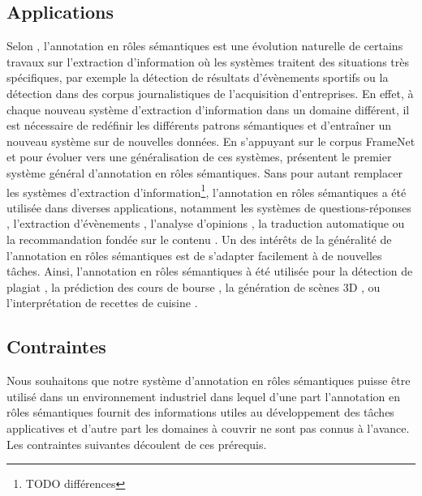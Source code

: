 \subsection{Applications}

Selon \cite{gildea2002automatic}, l'annotation en rôles sémantiques est une
évolution naturelle de certains travaux sur l'extraction d'information où les
systèmes traitent des situations très spécifiques, par exemple la détection de
résultats d'évènements sportifs ou la détection dans des corpus journalistiques
de l'acquisition d'entreprises. En effet, à chaque nouveau système d'extraction
d'information dans un domaine différent, il est nécessaire de redéfinir les
différents patrons sémantiques et d'entraîner un nouveau système sur de
nouvelles données. En s'appuyant sur le corpus FrameNet et pour évoluer vers
une généralisation de ces systèmes, \cite{gildea2002automatic} présentent le
premier système général d'annotation en rôles sémantiques. Sans pour autant
remplacer les systèmes d'extraction d'information\footnote{TODO différences},
l'annotation en rôles sémantiques a été utilisée dans diverses applications,
notamment les systèmes de questions-réponses \citep{shen2007using},
l'extraction d'évènements \citep{exner2011using},  l'analyse d'opinions
\citep{das2012structure}, la traduction automatique
\citep{bazrafshan2013semantic} ou la recommandation fondée sur le contenu
\citep{de2014exploiting}. Un des intérêts de la généralité de l'annotation en
rôles sémantiques est de s'adapter facilement à de nouvelles tâches. Ainsi,
l'annotation en rôles sémantiques à été utilisée pour la détection de plagiat
\citep{osman2012improved}, la prédiction des cours de bourse
\citep{xie2013semantic}, la génération de scènes 3D \citep{chang2014learning},
ou l'interprétation de recettes de cuisine \citep{malmaud2014cooking}.

\subsection{Contraintes}

Nous souhaitons que notre système d'annotation en rôles sémantiques puisse être
utilisé dans un environnement industriel dans lequel d'une part l'annotation en
rôles sémantiques fournit des informations utiles au développement des tâches
applicatives et d'autre part les domaines à couvrir ne sont pas connus à
l'avance. Les contraintes suivantes découlent de ces prérequis.

